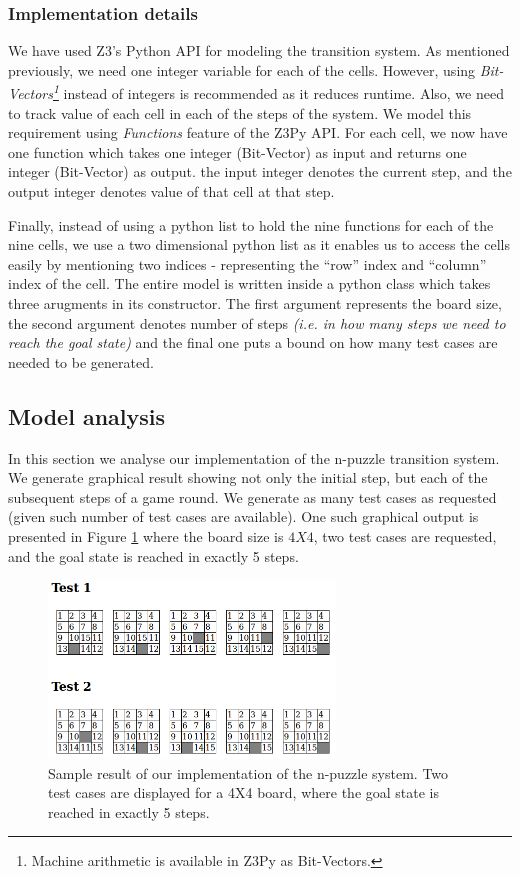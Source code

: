 \documentclass{sig-alternate-05-2015}
\begin{document}
\subsubsection{Implementation details}

We have used Z3's Python API for modeling the transition system. As mentioned previously, we need one 
integer variable for each of the cells. However, using \textit{Bit-Vectors\footnote{Machine arithmetic 
is available in Z3Py as Bit-Vectors.}} instead of integers is recommended as it reduces runtime. Also, 
we need to track value of each cell in each of the steps of the system. We model this requirement using 
\textit{Functions} feature of the Z3Py API. For each cell, we now have one function which takes one 
integer (Bit-Vector) as input and returns one integer (Bit-Vector) as output. the input integer denotes 
the current step, and the output integer denotes value of that cell at that step.

Finally, instead of using a python list to hold the nine functions for each of the nine cells, we use
a two dimensional python list as it enables us to access the cells easily by mentioning two 
indices - representing the ``row'' index and ``column'' index of the cell. The entire model 
is written inside a python class which takes three arugments in its constructor. The first 
argument represents the board size, the second argument denotes number of steps \textit{ (i.e. 
in how many steps we need to reach the goal state)} and the final one puts a bound on how 
many test cases are needed to be generated.


\subsection{Model analysis}

In this section we analyse our implementation of the n-puzzle transition system. We generate 
graphical result showing not only the initial step, but each of the subsequent 
steps of a game round. We generate as many test cases as requested (given such number of test 
cases are available). One such graphical output is presented in Figure \ref{fig:npdemo} where 
the board size is $4 X 4$, two test cases are requested, and the goal state is reached 
in exactly 5 steps.

\begin{figure}
\centering
\includegraphics[width=3in]{npdemo}
\caption{Sample result of our implementation of the n-puzzle system. Two test cases
are displayed for a 4X4 board, where the goal state is reached in exactly 5 steps.}
\label{fig:npdemo}
\end{figure}
\end{document}
